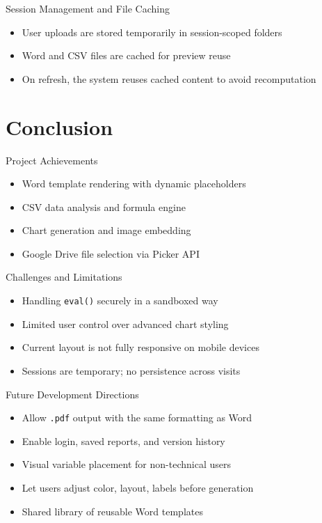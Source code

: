 \documentclass[handout, 12pt]{beamer}
\begin{document}
	\begin{frame}{Session Management and File Caching}
		\begin{itemize}
		  \item User uploads are stored temporarily in session-scoped folders
		  \item Word and CSV files are cached for preview reuse
		  \item On refresh, the system reuses cached content to avoid recomputation
		\end{itemize}
	\end{frame}

	\section{Conclusion}

	\begin{frame}{Project Achievements}
		\begin{itemize}
			\item Word template rendering with dynamic placeholders
			\item CSV data analysis and formula engine
			\item Chart generation and image embedding
			\item Google Drive file selection via Picker API
		\end{itemize}
	\end{frame}

	\begin{frame}{Challenges and Limitations}
		\begin{itemize}
			\item Handling \texttt{eval()} securely in a sandboxed way
			\item Limited user control over advanced chart styling
			\item Current layout is not fully responsive on mobile devices
			\item Sessions are temporary; no persistence across visits
		\end{itemize}
	\end{frame}

	\begin{frame}{Future Development Directions}
		\begin{itemize}
			\item Allow \texttt{.pdf} output with the same formatting as Word
			\item Enable login, saved reports, and version history
			\item Visual variable placement for non-technical users
			\item Let users adjust color, layout, labels before generation
			\item Shared library of reusable Word templates
		\end{itemize}
	\end{frame}
\end{document}
